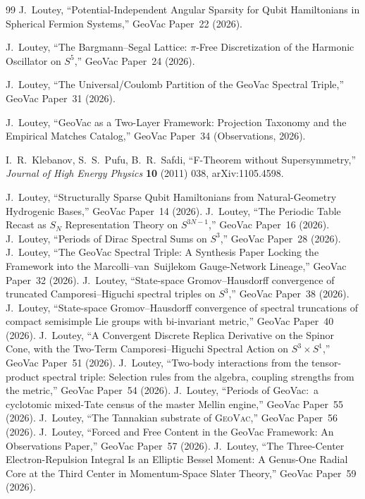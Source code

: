 \documentclass[aps,pra,twocolumn,superscriptaddress,longbibliography]{revtex4-2}
\begin{document}
\begin{thebibliography}{99}
J.~Loutey,
``Potential-Independent Angular Sparsity for Qubit Hamiltonians in Spherical Fermion Systems,''
GeoVac Paper~22 (2026).

J.~Loutey,
``The Bargmann--Segal Lattice: $\pi$-Free Discretization of the Harmonic Oscillator on $S^5$,''
GeoVac Paper~24 (2026).

J.~Loutey,
``The Universal/Coulomb Partition of the GeoVac Spectral Triple,''
GeoVac Paper~31 (2026).

J.~Loutey,
``GeoVac as a Two-Layer Framework: Projection Taxonomy and the Empirical Matches Catalog,''
GeoVac Paper~34 (Observations, 2026).

I.~R.~Klebanov, S.~S.~Pufu, B.~R.~Safdi,
``F-Theorem without Supersymmetry,''
\textit{Journal of High Energy Physics} \textbf{10} (2011) 038,
arXiv:1105.4598.

J.~Loutey,
``Structurally Sparse Qubit Hamiltonians from Natural-Geometry Hydrogenic Bases,''
GeoVac Paper~14 (2026).
J.~Loutey,
``The Periodic Table Recast as $S_N$ Representation Theory on $S^{3N-1}$,''
GeoVac Paper~16 (2026).
J.~Loutey,
``Periods of Dirac Spectral Sums on $S^3$,''
GeoVac Paper~28 (2026).
J.~Loutey,
``The GeoVac Spectral Triple: A Synthesis Paper Locking the Framework into the Marcolli--van~Suijlekom Gauge-Network Lineage,''
GeoVac Paper~32 (2026).
J.~Loutey,
``State-space Gromov--Hausdorff convergence of truncated Camporesi--Higuchi spectral triples on $S^3$,''
GeoVac Paper~38 (2026).
J.~Loutey,
``State-space Gromov--Hausdorff convergence of spectral truncations of compact semisimple Lie groups with bi-invariant metric,''
GeoVac Paper~40 (2026).
J.~Loutey,
``A Convergent Discrete Replica Derivative on the Spinor Cone, with the Two-Term Camporesi--Higuchi Spectral Action on $S^3\times S^1$,''
GeoVac Paper~51 (2026).
J.~Loutey,
``Two-body interactions from the tensor-product spectral triple: Selection rules from the algebra, coupling strengths from the metric,''
GeoVac Paper~54 (2026).
J.~Loutey,
``Periods of GeoVac:\ a cyclotomic mixed-Tate census of the master Mellin engine,''
GeoVac Paper~55 (2026).
J.~Loutey,
``The Tannakian substrate of \textsc{GeoVac},''
GeoVac Paper~56 (2026).
J.~Loutey,
``Forced and Free Content in the GeoVac Framework: An Observations Paper,''
GeoVac Paper~57 (2026).
J.~Loutey,
``The Three-Center Electron-Repulsion Integral Is an Elliptic Bessel Moment: A Genus-One Radial Core at the Third Center in Momentum-Space Slater Theory,''
GeoVac Paper~59 (2026).


\end{thebibliography}
\end{document}

